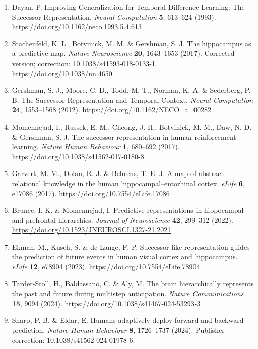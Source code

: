 \documentclass[11pt,a4paper]{article}
\begin{document}
\begin{enumerate}
\def\labelenumi{\arabic{enumi}.}
\item
  Dayan, P. Improving Generalization for Temporal Difference Learning:
  The Successor Representation. \emph{Neural Computation} \textbf{5},
  613–624 (1993). \url{https://doi.org/10.1162/neco.1993.5.4.613}
\item
  Stachenfeld, K. L., Botvinick, M. M. \& Gershman, S. J. The
  hippocampus as a predictive map. \emph{Nature Neuroscience}
  \textbf{20}, 1643–1653 (2017). Corrected version; correction:
  10.1038/s41593-018-0133-1. \url{https://doi.org/10.1038/nn.4650}
\item
  Gershman, S. J., Moore, C. D., Todd, M. T., Norman, K. A. \&
  Sederberg, P. B. The Successor Representation and Temporal Context.
  \emph{Neural Computation} \textbf{24}, 1553–1568 (2012).
  \url{https://doi.org/10.1162/NECO_a_00282}
\item
  Momennejad, I., Russek, E. M., Cheong, J. H., Botvinick, M. M., Daw,
  N. D. \& Gershman, S. J. The successor representation in human
  reinforcement learning. \emph{Nature Human Behaviour} \textbf{1},
  680–692 (2017). \url{https://doi.org/10.1038/s41562-017-0180-8}
\item
  Garvert, M. M., Dolan, R. J. \& Behrens, T. E. J. A map of abstract
  relational knowledge in the human hippocampal–entorhinal cortex.
  \emph{eLife} \textbf{6}, e17086 (2017).
  \url{https://doi.org/10.7554/eLife.17086}
\item
  Brunec, I. K. \& Momennejad, I. Predictive representations in
  hippocampal and prefrontal hierarchies. \emph{Journal of Neuroscience}
  \textbf{42}, 299–312 (2022).
  \url{https://doi.org/10.1523/JNEUROSCI.1327-21.2021}
\item
  Ekman, M., Kusch, S. \& de Lange, F. P. Successor-like representation
  guides the prediction of future events in human visual cortex and
  hippocampus. \emph{eLife} \textbf{12}, e78904 (2023).
  \url{https://doi.org/10.7554/eLife.78904}
\item
  Tarder-Stoll, H., Baldassano, C. \& Aly, M. The brain hierarchically
  represents the past and future during multistep anticipation.
  \emph{Nature Communications} \textbf{15}, 9094 (2024).
  \url{https://doi.org/10.1038/s41467-024-53293-3}
\item
  Sharp, P. B. \& Eldar, E. Humans adaptively deploy forward and
  backward prediction. \emph{Nature Human Behaviour} \textbf{8},
  1726–1737 (2024). Publisher correction: 10.1038/s41562-024-01978-6.

\end{enumerate}
\end{document}
